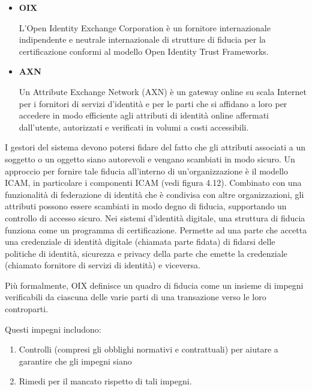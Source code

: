\begin{itemize}
    \item \textbf{OIX}
    
    L'Open Identity Exchange Corporation è un fornitore internazionale indipendente e neutrale internazionale di strutture di fiducia per la certificazione conformi al modello Open Identity Trust Frameworks.
    
    \item \textbf{AXN}
    
    Un Attribute Exchange Network (AXN) è un gateway online su scala Internet per i fornitori di servizi d'identità e per le parti che si affidano a loro per accedere in modo efficiente agli attributi di identità online affermati dall'utente, autorizzati e verificati in volumi a costi accessibili.

    
\end{itemize}

I gestori del sistema devono potersi fidare del fatto che gli attributi associati a un soggetto o un oggetto siano autorevoli e vengano scambiati in modo sicuro. Un approccio per fornire tale fiducia all'interno di un'organizzazione è il modello ICAM, in particolare i componenti ICAM (vedi figura 4.12). Combinato con una funzionalità di federazione di identità che è condivisa con altre organizzazioni, gli attributi possono essere scambiati in modo degno di fiducia, supportando un controllo di accesso sicuro. Nei sistemi d'identità digitale, una struttura di fiducia funziona come un programma di certificazione. Permette ad una parte che accetta una credenziale di identità digitale (chiamata parte fidata) di fidarsi delle politiche di identità, sicurezza e privacy della parte che emette la credenziale (chiamato fornitore di servizi di identità) e viceversa.

\singlespacing

Più formalmente, OIX definisce un quadro di fiducia come un insieme di impegni verificabili da ciascuna delle varie parti di una transazione verso le loro controparti.

\singlespacing

Questi impegni includono:

\begin{enumerate}
    \item Controlli (compresi gli obblighi normativi e contrattuali) per aiutare a garantire che gli impegni siano
    
    \item Rimedi per il mancato rispetto di tali impegni.
\end{enumerate}

